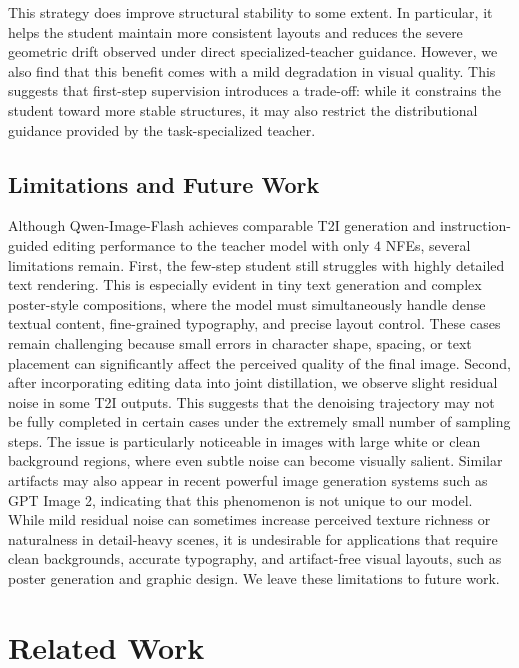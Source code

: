 \documentclass{article}
\begin{document}
This strategy does improve structural stability to some extent. In particular, it helps the student maintain more consistent layouts and reduces the severe geometric drift observed under direct specialized-teacher guidance. However, we also find that this benefit comes with a mild degradation in visual quality. This suggests that first-step supervision introduces a trade-off: while it constrains the student toward more stable structures, it may also restrict the distributional guidance provided by the task-specialized teacher.

\subsection{Limitations and Future Work}

Although Qwen-Image-Flash achieves comparable T2I generation and instruction-guided editing performance to the teacher model with only $4$ NFEs, several limitations remain. First, the few-step student still struggles with highly detailed text rendering. This is especially evident in tiny text generation and complex poster-style compositions, where the model must simultaneously handle dense textual content, fine-grained typography, and precise layout control. These cases remain challenging because small errors in character shape, spacing, or text placement can significantly affect the perceived quality of the final image. Second, after incorporating editing data into joint distillation, we observe slight residual noise in some T2I outputs. This suggests that the denoising trajectory may not be fully completed in certain cases under the extremely small number of sampling steps. The issue is particularly noticeable in images with large white or clean background regions, where even subtle noise can become visually salient. Similar artifacts may also appear in recent powerful image generation systems such as GPT Image 2, indicating that this phenomenon is not unique to our model. While mild residual noise can sometimes increase perceived texture richness or naturalness in detail-heavy scenes, it is undesirable for applications that require clean backgrounds, accurate typography, and artifact-free visual layouts, such as poster generation and graphic design. We leave these limitations to future work.




\section{Related Work}
\end{document}
